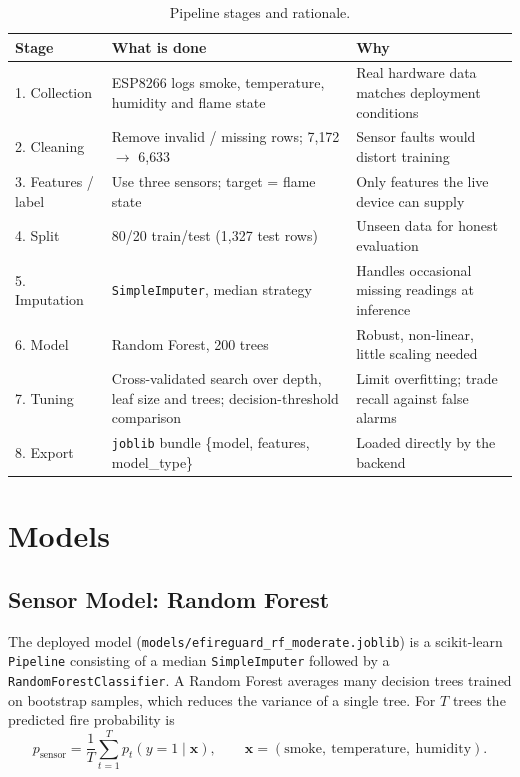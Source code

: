 \documentclass[12pt,a4paper]{article}
\begin{document}
\begin{table}[H]
\centering
\caption{Pipeline stages and rationale.}
\label{tab:stages}
\small
\begin{tabularx}{\textwidth}{l X X}
\toprule
\textbf{Stage} & \textbf{What is done} & \textbf{Why} \\
\midrule
1. Collection        & ESP8266 logs smoke, temperature, humidity and flame state & Real hardware data matches deployment conditions \\
2. Cleaning          & Remove invalid / missing rows; 7{,}172 $\rightarrow$ 6{,}633 & Sensor faults would distort training \\
3. Features / label  & Use three sensors; target = flame state & Only features the live device can supply \\
4. Split             & 80/20 train/test (1{,}327 test rows) & Unseen data for honest evaluation \\
5. Imputation        & \texttt{SimpleImputer}, median strategy & Handles occasional missing readings at inference \\
6. Model             & Random Forest, 200 trees & Robust, non-linear, little scaling needed \\
7. Tuning            & Cross-validated search over depth, leaf size and trees; decision-threshold comparison & Limit overfitting; trade recall against false alarms \\
8. Export            & \texttt{joblib} bundle \{model, features, model\_type\} & Loaded directly by the backend \\
\bottomrule
\end{tabularx}
\end{table}

\section{Models}

\subsection{Sensor Model: Random Forest}
The deployed model (\texttt{models/efireguard\_rf\_moderate.joblib}) is a scikit-learn \texttt{Pipeline} consisting of a median \texttt{SimpleImputer} followed by a \texttt{RandomForestClassifier}. A Random Forest averages many decision trees trained on bootstrap samples, which reduces the variance of a single tree. For $T$ trees the predicted fire probability is
\begin{equation}
  p_{\text{sensor}} = \frac{1}{T}\sum_{t=1}^{T} p_t(y = 1 \mid \mathbf{x}),
  \qquad \mathbf{x} = (\text{smoke},\ \text{temperature},\ \text{humidity}).
\end{equation}
\end{document}

